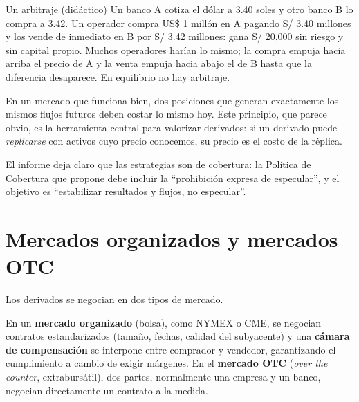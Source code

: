\begin{ejemplo}{Un arbitraje (didáctico)}
Un banco A cotiza el dólar a 3.40 soles y otro banco B lo compra a 3.42. Un operador compra US\$ 1 millón en A pagando S/ 3.40 millones y los vende de inmediato en B por S/ 3.42 millones: gana S/ 20,000 sin riesgo y sin capital propio. Muchos operadores harían lo mismo; la compra empuja hacia arriba el precio de A y la venta empuja hacia abajo el de B hasta que la diferencia desaparece. En equilibrio no hay arbitraje.
\end{ejemplo}

\begin{importante}
En un mercado que funciona bien, dos posiciones que generan exactamente los mismos flujos futuros deben costar lo mismo hoy. Este principio, que parece obvio, es la herramienta central para valorizar derivados: si un derivado puede \emph{replicarse} con activos cuyo precio conocemos, su precio es el costo de la réplica.
\end{importante}

\begin{informe}
El informe deja claro que las estrategias son de cobertura: la Política de Cobertura que propone debe incluir la \enquote{prohibición expresa de especular}, y el objetivo es \enquote{estabilizar resultados y flujos, no especular}.
\end{informe}

\section{Mercados organizados y mercados OTC}

Los derivados se negocian en dos tipos de mercado.

\begin{definicion}
En un \textbf{mercado organizado} (bolsa), como NYMEX o CME, se negocian contratos estandarizados (tamaño, fechas, calidad del subyacente) y una \textbf{cámara de compensación} se interpone entre comprador y vendedor, garantizando el cumplimiento a cambio de exigir márgenes. En el \textbf{mercado OTC} (\emph{over the counter}, extrabursátil), dos partes, normalmente una empresa y un banco, negocian directamente un contrato a la medida.
\end{definicion}

